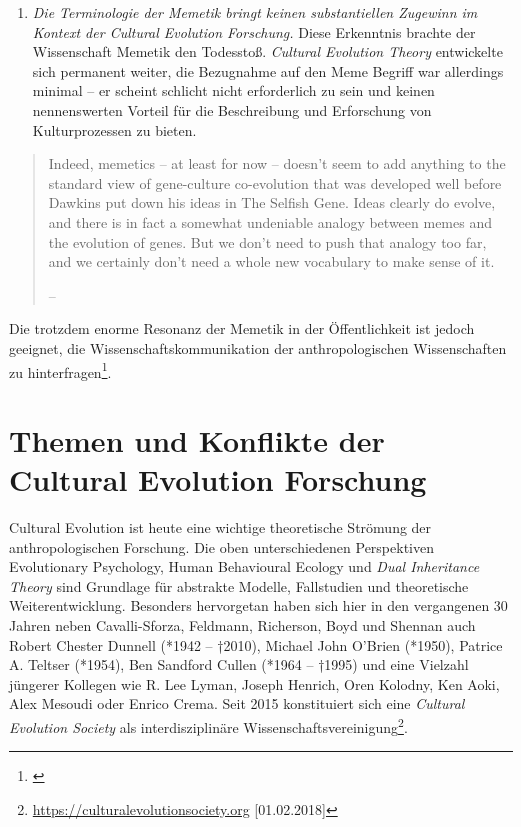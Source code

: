 \documentclass[openany,twoside,twocolumn]{book}
\providecommand{\tightlist}{%
  \setlength{\itemsep}{0pt}\setlength{\parskip}{0pt}}
\let\rmarkdownfootnote\footnote%
\def\footnote{\protect\rmarkdownfootnote}
\begin{document}
\begin{enumerate}
\def\labelenumi{\arabic{enumi}.}
\setcounter{enumi}{2}
\tightlist
\item
  \emph{Die Terminologie der Memetik bringt keinen substantiellen
  Zugewinn im Kontext der Cultural Evolution Forschung.} Diese
  Erkenntnis brachte der Wissenschaft Memetik den Todesstoß.
  \emph{Cultural Evolution Theory} entwickelte sich permanent weiter,
  die Bezugnahme auf den Meme Begriff war allerdings minimal -- er
  scheint schlicht nicht erforderlich zu sein und keinen nennenswerten
  Vorteil für die Beschreibung und Erforschung von Kulturprozessen zu
  bieten.
\end{enumerate}

\begin{quote}
Indeed, memetics -- at least for now -- doesn't seem to add anything to
the standard view of gene-culture co-evolution that was developed well
before Dawkins put down his ideas in The Selfish Gene. Ideas clearly do
evolve, and there is in fact a somewhat undeniable analogy between memes
and the evolution of genes. But we don't need to push that analogy too
far, and we certainly don't need a whole new vocabulary to make sense of
it.

-- \textcite{pigliucci_trouble_2007}
\end{quote}

Die trotzdem enorme Resonanz der Memetik in der Öffentlichkeit ist
jedoch geeignet, die Wissenschaftskommunikation der anthropologischen
Wissenschaften zu hinterfragen\footnote{\textcite{bloch_where_2005}}.

\hypertarget{themen-und-konflikte-der-cultural-evolution-forschung}{%
\section{Themen und Konflikte der Cultural Evolution
Forschung}\label{themen-und-konflikte-der-cultural-evolution-forschung}}

Cultural Evolution ist heute eine wichtige theoretische Strömung der
anthropologischen Forschung. Die oben unterschiedenen Perspektiven
Evolutionary Psychology, Human Behavioural Ecology und \emph{Dual
Inheritance Theory} sind Grundlage für abstrakte Modelle, Fallstudien
und theoretische Weiterentwicklung. Besonders hervorgetan haben sich
hier in den vergangenen 30 Jahren neben Cavalli-Sforza, Feldmann,
Richerson, Boyd und Shennan auch Robert Chester Dunnell (*1942 --
†2010), Michael John O'Brien (*1950), Patrice A. Teltser (*1954), Ben
Sandford Cullen (*1964 -- †1995) und eine Vielzahl jüngerer Kollegen wie
R. Lee Lyman, Joseph Henrich, Oren Kolodny, Ken Aoki, Alex Mesoudi oder
Enrico Crema. Seit 2015 konstituiert sich eine \emph{Cultural Evolution
Society} als interdisziplinäre Wissenschaftsvereinigung\footnote{\url{https://culturalevolutionsociety.org}
  {[}01.02.2018{]}}.
\end{document}
